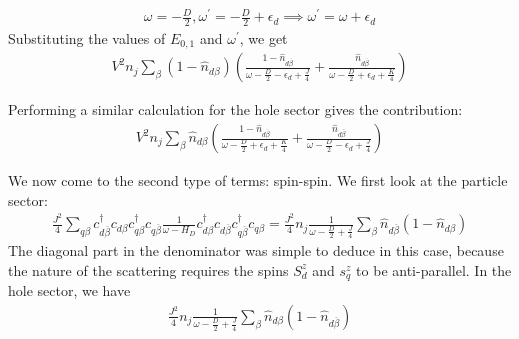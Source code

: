 \begin{equation}\begin{aligned}
	\omega = -\frac{D}{2}, \omega^\prime = -\frac{D}{2} + \epsilon_d \implies \omega^\prime = \omega + \epsilon_d
\end{aligned}\end{equation}
Substituting the values of \(E_{0,1}\) and \(\omega^\prime\), we get
\begin{equation}\begin{aligned}
	\label{ren_ed_Vp}
	V^2 n_j\sum_{\beta}\left( 1 - \hat n_{d\beta} \right)\left( \frac{1-\hat n_{d \overline\beta }}{\omega - \frac{D}{2} - \epsilon_d + \frac{J}{4}} + \frac{\hat n_{d \overline\beta}}{\omega - \frac{D}{2} + \epsilon_d + \frac{K}{4}}\right)
\end{aligned}\end{equation}

Performing a similar calculation for the hole sector gives the contribution:
\begin{equation}\begin{aligned}
	\label{ren_ed_Vh}
	V^2 n_j\sum_{\beta}\hat n_{d\beta}\left( \frac{1-\hat n_{d \overline\beta }}{\omega - \frac{D}{2} + \epsilon_d + \frac{K}{4}} + \frac{\hat n_{d \overline\beta}}{\omega - \frac{D}{2} - \epsilon_d + \frac{J}{4}}\right)
\end{aligned}\end{equation}

We now come to the second type of terms: spin-spin. We first look at the particle sector:
\begin{equation}\begin{aligned}
	\label{ren_ed_Jpp}
	\frac{J^2}{4}\sum_{q\beta}c^\dagger_{d\overline\beta}c_{d\beta}c^\dagger_{q\beta}c_{q\overline\beta} \frac{1}{\omega - H_D}c^\dagger_{d\beta}c_{d\overline\beta}c^\dagger_{q\overline\beta}c_{q\beta} = \frac{J^2}{4} n_j\frac{1}{\omega - \frac{D}{2} + \frac{J}{4}} \sum_{\beta}\hat n_{d\overline\beta}\left( 1 - \hat n_{d\beta} \right)
\end{aligned}\end{equation}
The diagonal part in the denominator was simple to deduce in this case, because the nature of the scattering requires the spins \(S_d^z\) and \(s_q^z\) to be anti-parallel. In the hole sector, we have
\begin{equation}\begin{aligned}
	\label{ren_ed_Jph}
	\frac{J^2}{4} n_j\frac{1}{\omega - \frac{D}{2} + \frac{J}{4}} \sum_{\beta}\hat n_{d\beta}\left( 1 - \hat n_{d\overline\beta} \right)
\end{aligned}\end{equation}

